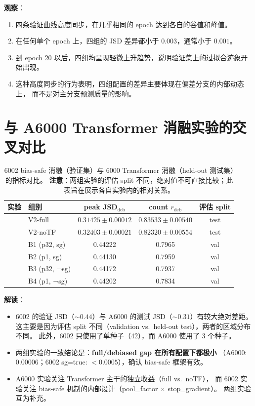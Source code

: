 \documentclass[11pt,a4paper]{ctexart}
\begin{document}
\textbf{观察}：
\begin{enumerate}[leftmargin=2em]
  \item 四条验证曲线高度同步，在几乎相同的 epoch 达到各自的谷值和峰值。
  \item 在任何单个 epoch 上，四组的 JSD 差异都小于 $0.003$，通常小于 $0.001$。
  \item 到 epoch 20 以后，四组均呈现轻微上升趋势，说明验证集上的过拟合迹象开始出现。
  \item 这种高度同步的行为表明，四组配置的差异主要体现在偏差分支的内部动态上，
    而不是对主分支预测质量的影响。
\end{enumerate}

\section{与 A6000 Transformer 消融实验的交叉对比}

\begin{table}[H]
\centering
\small
\caption{6002 bias-safe 消融（验证集）与 6000 Transformer 消融（held-out 测试集）的指标对比。
\textbf{注意}：两组实验的评估 split 不同，绝对值不可直接比较；此表旨在展示各自实验内的相对关系。}
\label{tab:cross_compare}
\begin{tabular}{l l c c c}
\toprule
实验 & 组别 & peak JSD$_\text{deb}$ & count $r_\text{deb}$ & 评估 split \\
\midrule
{}
  & V2-full & $0.31425 \pm 0.00012$ & $0.83533 \pm 0.00540$ & test \\
  & V2-noTF & $0.32403 \pm 0.00021$ & $0.82320 \pm 0.00554$ & test \\
\midrule
{}
  & B1 (p32, sg) & 0.44222 & 0.7965 & val \\
  & B2 (p1, sg) & 0.44130 & 0.7959 & val \\
  & B3 (p32, ¬sg) & 0.44172 & 0.7937 & val \\
  & B4 (p1, ¬sg) & 0.44202 & 0.7834 & val \\
\bottomrule
\end{tabular}
\end{table}

\textbf{解读}：
\begin{itemize}[leftmargin=2em]
  \item 6002 的验证 JSD（$\sim 0.44$）与 A6000 的测试 JSD（$\sim 0.31$）有较大绝对差距。
    这主要是因为评估 split 不同（validation vs.\ held-out test），两者的区域分布不同。
    此外，6002 只使用了单种子（42），而 A6000 使用了 3 个种子。
  \item 两组实验的一致结论是：\textbf{full/debiased gap 在所有配置下都极小}
    （A6000: $0.00006$；6002 sg=true: $< 0.0005$），确认 bias-safe 框架有效。
  \item A6000 实验关注 Transformer 主干的独立收益（full vs.\ noTF），
    而 6002 实验关注 bias-safe 机制的内部设计（pool\_factor × stop\_gradient）。
    两组实验互为补充。
\end{itemize}
\end{document}
